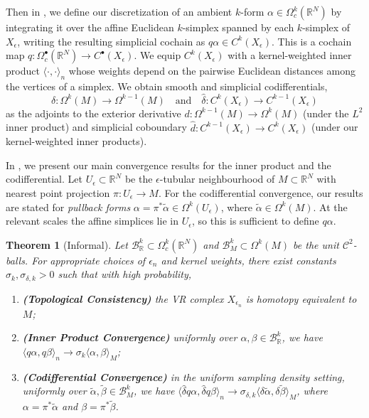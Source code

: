 \documentclass[11pt,reqno]{amsproc}
\numberwithin{equation}{section}
\newcommand{\R}{\mathbb{R}}
\newcommand{\cB}{\mathcal{B}}
\newcommand{\cC}{\mathcal{C}}
\newcommand{\talpha}{\tilde{\alpha}}
\newcommand{\hd}{\hat{d}}
\newcommand{\hdelta}{\hat{\delta}}
\newtheorem{theorem}[counter]{Theorem}
\newcommand{\andd}{\quad \text{and} \quad}
\theoremstyle{definition}
\theoremstyle{plain}
\begin{document}
Then in , we define our discretization of an ambient $k$-form $\alpha \in \Omega^k_c(\R^N)$ by integrating it over the affine Euclidean $k$-simplex spanned by each $k$-simplex of $X_{\epsilon}$, writing the resulting simplicial cochain as $q\alpha \in C^k(X_\epsilon)$. This is a cochain map $q: \Omega^\bullet_c(\R^N) \to C^\bullet(X_\epsilon)$. We equip $C^k(X_{\epsilon})$ with a kernel-weighted inner product $\langle \cdot, \cdot\rangle_n$ whose weights depend on the pairwise Euclidean distances among the vertices of a simplex. We obtain smooth and simplicial codifferentials,
\begin{equation}
\delta: \Omega^k(M) \to \Omega^{k-1}(M) \andd \hdelta: C^k(X_\epsilon) \to C^{k-1}(X_\epsilon)
\end{equation}
as the adjoints to the exterior derivative $d: \Omega^{k-1}(M) \to \Omega^k(M)$ (under the $L^2$ inner product) and simplicial coboundary $\hd: C^{k-1}(X_\epsilon) \to C^k(X_\epsilon)$ (under our kernel-weighted inner products).

In , we present our main convergence results for the inner product and the codifferential. Let $U_\epsilon \subset \R^N$ be the $\epsilon$-tubular neighbourhood of $M \subset \R^N$ with nearest point projection $\pi: U_\epsilon \to M$. For the codifferential convergence, our results are stated for \emph{pullback forms} $\alpha = \pi^* \talpha \in \Omega^k(U_\epsilon)$, where $\talpha \in \Omega^k(M)$. At the relevant scales the affine simplices lie in $U_\epsilon$, so this is sufficient to define $q\alpha$.

\begin{theorem}[Informal]
    Let $\cB^k_\R\subset \Omega^k_c(\R^N)$ and $\cB^k_M\subset \Omega^k(M)$ be the unit $\cC^2$-balls. For appropriate choices of $\epsilon_n$ and kernel weights, there exist constants $\sigma_k, \sigma_{\delta, k} > 0$ such that with high probability,
    \begin{enumerate}
        \item \emph{\textbf{(Topological Consistency)}} the VR complex $X_{\epsilon_n}$ is homotopy equivalent to $M$;
        \item \emph{\textbf{(Inner Product Convergence)}} uniformly over $\alpha, \beta \in \cB^k_\R$, we have $\langle q\alpha, q\beta\rangle_n \to \sigma_k \langle \alpha, \beta \rangle_M$;
        \item \emph{\textbf{(Codifferential Convergence)}} in the uniform sampling density setting, uniformly over $\tilde{\alpha}, \tilde{\beta} \in \cB^k_M$, we have $\langle \hdelta q \alpha, \hdelta q \beta \rangle_n \to \sigma_{\delta, k} \langle \delta \tilde{\alpha}, \delta \tilde{\beta} \rangle_M$, where $\alpha = \pi^* \tilde{\alpha}$ and $\beta = \pi^* \tilde{\beta}$.
    \end{enumerate}
\end{theorem}
\end{document}
